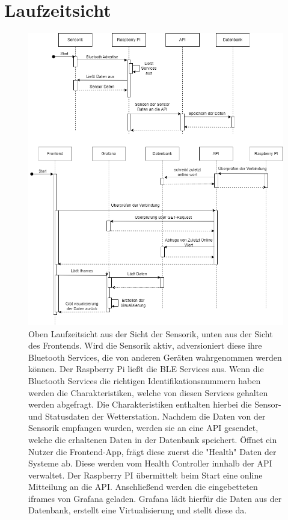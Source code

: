 \documentclass[
]{article}
\begin{document}
\section{Laufzeitsicht}
\begin{figure}[H]
	\centering
	\includegraphics[width=160mm]{resources/Laufzeitsicht.png}
	\caption{Oben Laufzeitsicht aus der Sicht der Sensorik, unten aus der Sicht des Frontends. Wird die Sensorik aktiv, adversioniert diese ihre Bluetooth Services, die von anderen Geräten wahrgenommen werden können. Der Raspberry Pi ließt die BLE Services aus. Wenn die Bluetooth Services die richtigen Identifikationsnummern haben werden die Charakteristiken, welche von diesen Services gehalten werden abgefragt. Die Charakteristiken enthalten hierbei die Sensor- und Statusdaten der Wetterstation. Nachdem die Daten von der Sensorik empfangen wurden, werden sie an eine API gesendet, welche die erhaltenen Daten in der Datenbank speichert. Öffnet ein Nutzer die Frontend-App, frägt diese zuerst die "Health" Daten der Systeme ab. Diese werden vom Health Controller innhalb der API verwaltet. Der Raspberry PI übermittelt beim Start eine online Mitteilung an die API. Anschließend werden die eingebetteten iframes von Grafana geladen. Grafana lädt hierfür die Daten aus der Datenbank, erstellt eine Virtualisierung und stellt diese da.}
	\label{fig:Laufzeitsicht}
\end{figure}  
\end{document}
